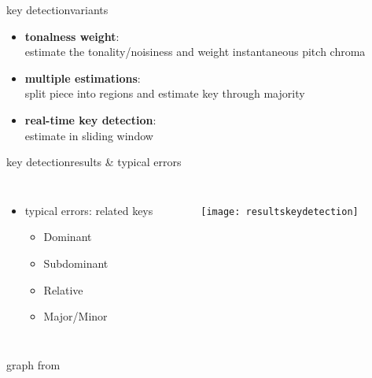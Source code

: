         \begin{frame}{key detection}{variants}
            \begin{itemize}
                \item	\textbf{tonalness weight}:\\ estimate the tonality/noisiness and weight instantaneous pitch chroma
                \item<2->	\textbf{multiple estimations}:\\ split piece into regions and estimate key through majority
                \item<3->	\textbf{real-time key detection}:\\ estimate in sliding window
            \end{itemize}
        \end{frame}
        \begin{frame}{key detection}{results \& typical errors}
            \begin{columns}[T]
                \begin{itemize}
                    \item	typical errors: related keys
                        \begin{itemize}
                            \item	Dominant
                            \item	Subdominant
                            \item	Relative
                            \item	Major/Minor
                        \end{itemize}
                \end{itemize}
                \begin{figure}
                    \centering
                        \texttt{[image: resultskeydetection]}
                \end{figure}
            \end{columns}
            \begin{flushright}
                graph from 
            \end{flushright}
        \end{frame}


